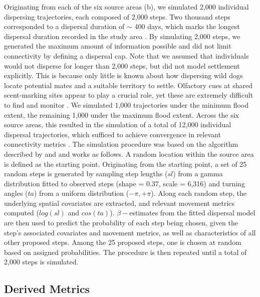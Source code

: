 \documentclass[abstract=on,10pt,a4paper,bibliography=totocnumbered]{article}
\begin{document}
Originating from each of the six source areas (b), we simulated
2,000 individual dispersing trajectories, each composed of 2,000 steps. Two
thousand steps corresponded to a dispersal duration of $\sim$ 400 days, which
marks the longest dispersal duration recorded in the study area
\citep{Cozzi.2020, Hofmann.2021}. By simulating 2,000 steps, we generated the
maximum amount of information possible and did not limit connectivity by
defining a dispersal cap. Note that we assumed that individuals would not
disperse for longer than 2,000 steps, but did not model settlement explicitly.
This is because only little is known about how dispersing wild dogs locate
potential mates and a suitable territory to settle. Olfactory cues at shared
scent-marking sites appear to play a crucial role, yet these are extremely
difficult to find and monitor \citep{Apps.2022, Claase.2022}. We simulated 1,000
trajectories under the minimum flood extent, the remaining 1,000 under the
maximum flood extent. Across the six source areas, this resulted in the
simulation of a total of 12,000 individual dispersal trajectories, which
sufficed to achieve convergence in relevant connectivity metrics
\citep{Hofmann.2023}. The simulation procedure was based on the algorithm
described by \citep{Signer.2017} and \citet{Hofmann.2023} and works as follows.
A random location within the source area is defined as the starting point.
Originating from the starting point, a set of 25 random steps is generated by
sampling step lengths ($sl$) from a gamma distribution fitted to observed steps
(shape = 0.37, scale = 6,316) and turning angles ($ta$) from a uniform
distribution ($-\pi, +\pi$). Along each random step, the underlying spatial
covariates are extracted, and relevant movement metrics computed ($log(sl)$ and
$cos(ta)$). \(\beta-\)estimates from the fitted dispersal model are then used to
predict the probability of each step being chosen, given the step's associated
covariates and movement metrics, as well as characteristics of all other
proposed steps. Among the 25 proposed steps, one is chosen at random based on
assigned probabilities. The procedure is then repeated until a total of 2,000
steps is simulated.

\subsection{Derived Metrics}
\end{document}
